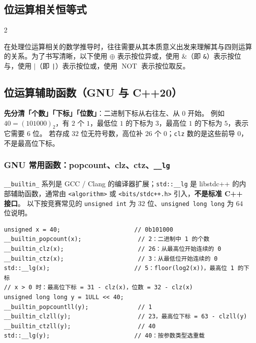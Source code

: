 	\begin{center}
		\section{位运算相关恒等式}
	\end{center}

	\begin{multicols*}{2}

		在处理位运算相关的数学推导时，往往需要从其本质意义出发来理解其与四则运算的关系。为了书写清晰，以下使用 $\oplus$ 表示按位异或，使用 $\mathbin{\&}$（即 \texttt{\&}）表示按位与，使用 $\mathbin{|}$（即 \texttt{|}）表示按位或，使用 $\operatorname{NOT}$ 表示按位取反。

\subsection{位运算辅助函数（GNU 与 C++20）}

\textbf{先分清「个数」「下标」「位数」}：二进制下标从右往左、从 $0$ 开始。
例如 $40=(101000)_2$，有 $2$ 个 $1$，最低位 $1$ 的下标为 $3$，最高位 $1$ 的下标为 $5$，表示它需要 $6$ 位。
若存成 $32$ 位无符号数，高位补 $26$ 个 $0$；\texttt{clz} 数的是这些前导 $0$，不是最高位下标。

\subsubsection{GNU 常用函数：popcount、clz、ctz、\texorpdfstring{\texttt{\_\_lg}}{\_\_lg}}

\texttt{\_\_builtin\_} 系列是 GCC / Clang 的编译器扩展；\texttt{std::\_\_lg} 是 libstdc++ 的内部辅助函数，通常由 \texttt{<algorithm>} 或 \texttt{<bits/stdc++.h>} 引入，\textbf{不是标准 C++ 接口}。
以下按竞赛常见的 \texttt{unsigned int} 为 $32$ 位、\texttt{unsigned long long} 为 $64$ 位说明。

\begin{verbatim}
unsigned x = 40;                     // 0b101000
__builtin_popcount(x);                // 2：二进制中 1 的个数
__builtin_clz(x);                     // 26：从最高位开始连续的 0
__builtin_ctz(x);                     // 3：从最低位开始连续的 0
std::__lg(x);                        // 5：floor(log2(x))，最高位 1 的下标
// x > 0 时：最高位下标 = 31 - clz(x)，位数 = 32 - clz(x)
unsigned long long y = 1ULL << 40;
__builtin_popcountll(y);              // 1
__builtin_clzll(y);                   // 23，最高位下标 = 63 - clzll(y)
__builtin_ctzll(y);                   // 40
std::__lg(y);                        // 40：按参数类型选重载
\end{verbatim}


\end{multicols*}
